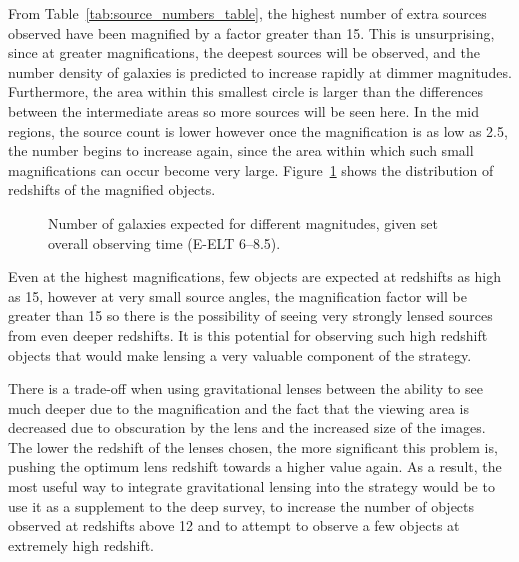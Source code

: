 	From Table~\ref{tab:source_numbers_table}, the highest number of extra sources observed have been magnified by a factor greater than 15. This is unsurprising, since at greater magnifications, the deepest sources will be observed, and the number density of galaxies is predicted to increase rapidly at dimmer magnitudes. Furthermore, the area within this smallest circle is larger than the differences between the intermediate areas so more sources will be seen here. In the mid regions, the source count is lower however once the magnification is as low as 2.5, the number begins to increase again, since the area within which such small magnifications can occur become very large. Figure~\ref{fig:distribution_of_magnification1} shows the distribution of redshifts of the magnified objects.
	\begin{figure}[htbp]
    	\begin{minipage}[c]{0.5\linewidth}
			\centering
				\begingroup{}
					\resizebox{\textwidth}{!}{%
						
					}\endgroup
		\end{minipage}
    	\begin{minipage}[c]{0.5\linewidth}
			\centering
				\begingroup{}
					\resizebox{\textwidth}{!}{%
						
					}\endgroup
		\end{minipage}
		\caption{Number of galaxies expected for different magnitudes, given set overall observing time (E-ELT 6--8.5).\label{fig:distribution_of_magnification1}}
	\end{figure}

	Even at the highest magnifications, few objects are expected at redshifts as high as 15, however at very small source angles, the magnification factor will be greater than 15 so there is the possibility of seeing very strongly lensed sources from even deeper redshifts. It is this potential for observing such high redshift objects that would make lensing a very valuable component of the strategy.

	There is a trade-off when using gravitational lenses between the ability to see much deeper due to the magnification and the fact that the viewing area is decreased due to obscuration by the lens and the increased size of the images. The lower the redshift of the lenses chosen, the more significant this problem is, pushing the optimum lens redshift towards a higher value again. As a result, the most useful way to integrate gravitational lensing into the strategy would be to use it as a supplement to the deep survey, to increase the number of objects observed at redshifts above 12 and to attempt to observe a few objects at extremely high redshift.

